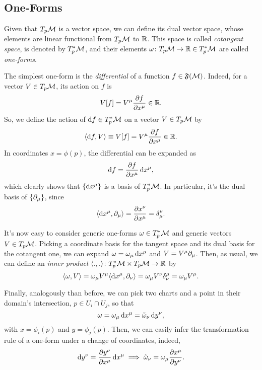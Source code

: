 \subsection{One-Forms}
Given that $T_p \mathcal{M}$ is a vector space, we can define its dual vector space, whose elements are linear functional from $T_p \mathcal{M}$ to $\mathbb{R}$. This space is called \emph{cotangent space}, is denoted by $T^*_p \mathcal{M}$, and their elements $\omega \colon T_p \mathcal{M} \to \mathbb{R} \in T^*_p \mathcal{M}$ are called \emph{one-forms}.

The simplest one-form is the \emph{differential} of a function $f \in \mathfrak{F}(\mathcal{M})$. Indeed, for a vector $V \in T_p \mathcal{M}$, its action on $f$ is
\begin{equation}
    V[f] = V^\mu \frac{\partial f}{\partial x^\mu} \in \mathbb{R}.
\end{equation}
So, we define the action of $\mathop{}\!\mathrm{d} f \in T^*_p \mathcal{M}$ on a vector $V \in T_p \mathcal{M}$ by
\begin{equation}
    \langle \mathop{}\!\mathrm{d} f, V \rangle \equiv V[f] = V^\mu \frac{\partial f}{\partial x^\mu} \in \mathbb{R}.
\end{equation}
In coordinates $x = \phi(p)$, the differential can be expanded as
\begin{equation}
    \mathop{}\!\mathrm{d} f = \frac{\partial f}{\partial x^\mu} \mathop{}\!\mathrm{d} x^\mu,
\end{equation}
which clearly shows that $\{ \mathop{}\!\mathrm{d} x^\mu \}$ is a basis of $T^*_p \mathcal{M}$. In particular, it's the dual basis of $\{ \partial_\mu \}$, since
\begin{equation}
    \langle \mathop{}\!\mathrm{d} x^\mu, \partial_\mu \rangle = \frac{\partial x^\nu}{\partial x^\mu} = \delta^\nu_\mu .
\end{equation}

It's now easy to consider generic one-forms $\omega \in T^*_p \mathcal{M}$ and generic vectors $V \in T_p \mathcal{M}$. Picking a coordinate basis for the tangent space and its dual basis for the cotangent one, we can expand $\omega = \omega_\mu \mathop{}\!\mathrm{d} x^\mu$ and $V = V^\mu \partial_\mu$. Then, as usual, we can define an \emph{inner product} $\langle ., . \rangle\colon T^*_p \mathcal{M} \times T_p \mathcal{M} \to \mathbb{R}$ by
\begin{equation}
    \langle \omega, V \rangle = \omega_\mu V^\mu \langle \mathop{}\!\mathrm{d} x^\mu, \partial_\nu \rangle = \omega_\mu V^\nu \delta^\mu_\nu = \omega_\mu V^\mu.
\end{equation}

Finally, analogously than before, we can pick two charts and a point in their domain's intersection, $p \in U_i \cap U_j$, so that
\begin{equation}
    \omega = \omega_\mu \mathop{}\!\mathrm{d} x^\mu = \tilde{\omega}_\nu \mathop{}\!\mathrm{d} y^\nu,
\end{equation}
with $x = \phi_i(p)$ and $y=\phi_j(p)$. Then, we can easily infer the transformation rule of a one-form under a change of coordinates, indeed,
\begin{equation}
    \mathop{}\!\mathrm{d} y^\nu = \frac{\partial y^\nu}{\partial x^\mu} \mathop{}\!\mathrm{d} x^\mu \implies \tilde{\omega}_\nu = \omega_\mu \frac{\partial x^\mu}{\partial y^\nu} .
\end{equation}

